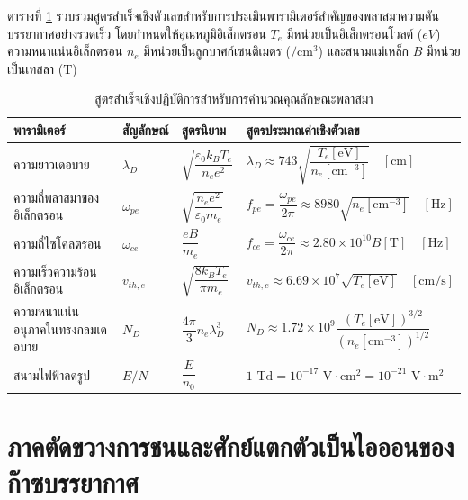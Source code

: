 ตารางที่ \ref{tab:app_plasma_formulas} รวบรวมสูตรสำเร็จเชิงตัวเลขสำหรับการประเมินพารามิเตอร์สำคัญของพลาสมาความดันบรรยากาศอย่างรวดเร็ว โดยกำหนดให้อุณหภูมิอิเล็กตรอน $T_e$ มีหน่วยเป็นอิเล็กตรอนโวลต์ ($\si{eV}$) ความหนาแน่นอิเล็กตรอน $n_e$ มีหน่วยเป็นลูกบาศก์เซนติเมตร ($\si{\per\centi\meter\cubed}$) และสนามแม่เหล็ก $B$ มีหน่วยเป็นเทสลา ($\si{\tesla}$)

\begin{table}[H]
\centering
\caption{สูตรสำเร็จเชิงปฏิบัติการสำหรับการคำนวณคุณลักษณะพลาสมา}
\label{tab:app_plasma_formulas}
\begin{tabularx}{\textwidth}{l l l X}
\toprule
\textbf{พารามิเตอร์} & \textbf{สัญลักษณ์} & \textbf{สูตรนิยาม} & \textbf{สูตรประมาณค่าเชิงตัวเลข} \\
\midrule
ความยาวเดอบาย & $\lambda_D$ & $\sqrt{\dfrac{\varepsilon_0 k_B T_e}{n_e e^2}}$ & $\lambda_D \approx 743 \sqrt{\dfrac{T_e [\text{eV}]}{n_e [\text{cm}^{-3}]}}\quad [\si{\centi\meter}]$ \\[8pt]
ความถี่พลาสมาของอิเล็กตรอน & $\omega_{pe}$ & $\sqrt{\dfrac{n_e e^2}{\varepsilon_0 m_e}}$ & $f_{pe} = \dfrac{\omega_{pe}}{2\pi} \approx 8980 \sqrt{n_e [\text{cm}^{-3}]}\quad [\si{\hertz}]$ \\[8pt]
ความถี่ไซโคลตรอน & $\omega_{ce}$ & $\dfrac{e B}{m_e}$ & $f_{ce} = \dfrac{\omega_{ce}}{2\pi} \approx 2.80 \times 10^{10} B [\text{T}]\quad [\si{\hertz}]$ \\[8pt]
ความเร็วความร้อนอิเล็กตรอน & $v_{th,e}$ & $\sqrt{\dfrac{8 k_B T_e}{\pi m_e}}$ & $v_{th,e} \approx 6.69 \times 10^7 \sqrt{T_e [\text{eV}]}\quad [\si{\centi\meter\per\second}]$ \\[8pt]
ความหนาแน่นอนุภาคในทรงกลมเดอบาย & $N_D$ & $\dfrac{4\pi}{3} n_e \lambda_D^3$ & $N_D \approx 1.72 \times 10^9 \dfrac{(T_e [\text{eV}])^{3/2}}{(n_e [\text{cm}^{-3}])^{1/2}}$ \\[8pt]
สนามไฟฟ้าลดรูป & $E/N$ & $\dfrac{E}{n_0}$ & $1\text{ Td} = 10^{-17}\text{ V}\cdot\text{cm}^2 = 10^{-21}\text{ V}\cdot\text{m}^2$ \\
\bottomrule
\end{tabularx}
\end{table}

\section{ภาคตัดขวางการชนและศักย์แตกตัวเป็นไอออนของก๊าซบรรยากาศ}
\label{app:sec_cross_sections}

